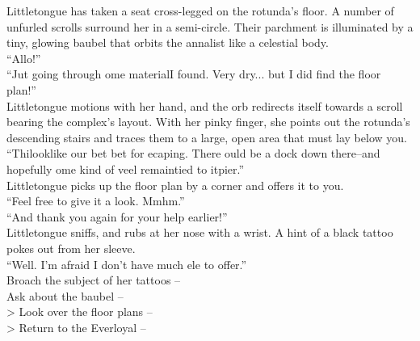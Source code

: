Littletongue has taken a seat cross-legged on the rotunda’s floor. A number of unfurled scrolls surround her in a semi-circle. Their parchment is illuminated by a tiny, glowing baubel that orbits the annalist like a celestial body.\\

“Allo!”\\

“Ju\lisp t going through \lisp ome material\lispx I found. Very dry... but I did find the floor plan!”\\

Littletongue motions with her hand, and the orb redirects itself towards a scroll bearing the complex’s layout. With her pinky finger, she points out the rotunda’s descending stairs and traces them to a large, open area that must lay below you.\\

“Thi\lispx look\lispx like our be\lisp t bet for e\lisp caping. There \lisp ould be a dock down there--and hopefully \lisp ome kind of ve\lisp el remain\lispx tied to it\lispx pier.”\\

Littletongue picks up the floor plan by a corner and offers it to you.\\
“Feel free to give it a look. Mmhm.”\\

“And thank you again for your help earlier!”\\

Littletongue sniffs, and rubs at her nose with a wrist. A hint of a black tattoo pokes out from her sleeve.\\

“Well. I’m afraid I don’t have much el\lisp e to offer.”\\

 Broach the subject of her tattoos -- \\
 Ask about the baubel -- \\
> Look over the floor plans -- \\
> Return to the Everloyal -- 